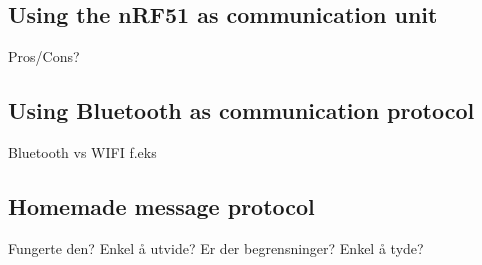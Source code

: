 \subsection{Using the nRF51 as communication unit}
Pros/Cons?

\subsection{Using Bluetooth as communication protocol}
Bluetooth vs WIFI f.eks

\subsection{Homemade message protocol}
Fungerte den? Enkel å utvide? Er der begrensninger? Enkel å tyde?